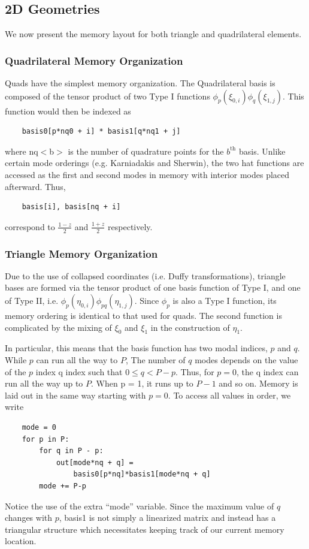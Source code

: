 \subsection{2D Geometries}

We now present the memory layout for both triangle and quadrilateral elements.

\subsubsection{Quadrilateral Memory Organization}
Quads have the simplest memory organization. The Quadrilateral basis is composed of the tensor product of two Type I functions $\phi_p(\xi_{0,i}) \phi_q(\xi_{1,j})$. This function would then be indexed as

\begin{lstlisting}
    basis0[p*nq0 + i] * basis1[q*nq1 + j]
\end{lstlisting}
where nq$<$b$>$ is the number of quadrature points for the $b^{\text{th}}$ basis. Unlike certain mode orderings (e.g. Karniadakis and Sherwin), the two hat functions are accessed as the first and second modes in memory with interior modes placed afterward. Thus,
\begin{lstlisting}
    basis[i], basis[nq + i]
\end{lstlisting}
correspond to $\frac{1 - z}{2}$ and $\frac{1 + z}{2}$ respectively.

\subsubsection{Triangle Memory Organization}
Due to the use of collapsed coordinates (i.e. Duffy transformations), triangle bases are formed via the tensor product of one basis function of Type I, and one of Type II, i.e. $\phi_p(\eta_{0,i}) \phi_{pq}(\eta_{1,j})$. Since $\phi_p$ is also a Type I function, its memory ordering is identical to that used for quads. The second function is complicated by the mixing of $\xi_0$ and $\xi_1$ in the construction of $\eta_1$.

In particular, this means that the basis function has two modal indices, $p$ and $q$. While $p$ can run all the way to $P$, The number of $q$ modes depends on the value of the $p$ index q index such that $0 \leq q < P - p$. Thus, for $p = 0$, the q index can run all the way up to $P$. When p = 1, it runs up to $P - 1$ and so on. Memory is laid out in the same way starting with $p=0$. To access all values in order, we write\\
\begin{lstlisting}
    mode = 0
    for p in P:
        for q in P - p:
            out[mode*nq + q] = 
                basis0[p*nq]*basis1[mode*nq + q]
        mode += P-p
\end{lstlisting}
Notice the use of the extra ``mode'' variable. Since the maximum value of $q$ changes with $p$, basis1 is not simply a linearized matrix and instead has a triangular structure which necessitates keeping track of our current memory location.


